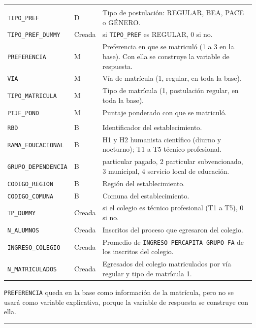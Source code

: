 \documentclass[11pt,letterpaper]{article}
\begin{document}
\begin{longtable}{>{\raggedright\arraybackslash}p{5.4cm}
                  >{\raggedright\arraybackslash}p{1.4cm}
                  >{\raggedright\arraybackslash}p{6.6cm}}
\midrule
\multicolumn{3}{l}{\textit{Postulación y matrícula}} \\
\texttt{TIPO\_PREF} & D & Tipo de postulación: REGULAR, BEA, PACE o GÉNERO. \\
\texttt{TIPO\_PREF\_DUMMY} & Creada & 1 si \texttt{TIPO\_PREF} es REGULAR, 0 si no. \\
\texttt{PREFERENCIA} & M & Preferencia en que se matriculó (1 a 3 en la base). Con ella se construye la variable de respuesta. \\
\texttt{VIA} & M & Vía de matrícula (1, regular, en toda la base). \\
\texttt{TIPO\_MATRICULA} & M & Tipo de matrícula (1, postulación regular, en toda la base). \\
\texttt{PTJE\_POND} & M & Puntaje ponderado con que se matriculó. \\
\midrule
\multicolumn{3}{l}{\textit{Colegio de egreso}} \\
\texttt{RBD} & B & Identificador del establecimiento. \\
\texttt{RAMA\_EDUCACIONAL} & B & H1 y H2 humanista científico (diurno y nocturno); T1 a T5 técnico profesional. \\
\texttt{GRUPO\_DEPENDENCIA} & B & 1 particular pagado, 2 particular subvencionado, 3 municipal, 4 servicio local de educación. \\
\texttt{CODIGO\_REGION} & B & Región del establecimiento. \\
\texttt{CODIGO\_COMUNA} & B & Comuna del establecimiento. \\
\texttt{TP\_DUMMY} & Creada & 1 si el colegio es técnico profesional (T1 a T5), 0 si no. \\
\texttt{N\_ALUMNOS} & Creada & Inscritos del proceso que egresaron del colegio. \\
\texttt{INGRESO\_COLEGIO} & Creada & Promedio de \texttt{INGRESO\_PERCAPITA\_GRUPO\_FA} de los inscritos del colegio. \\
\texttt{N\_MATRICULADOS} & Creada & Egresados del colegio matriculados por vía regular y tipo de matrícula 1. \\
\end{longtable}

\texttt{PREFERENCIA} queda en la base como información de la matrícula,
pero no se usará como variable explicativa, porque la variable de
respuesta se construye con ella.

\medskip\hrule\medskip

\end{document}
